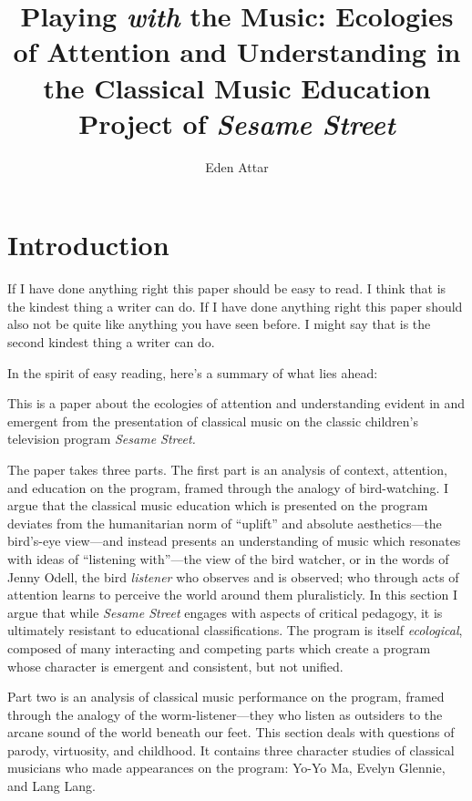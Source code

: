 \documentclass[12pt,letterpaper]{article}
\begin{document}
	
	\title{Playing \textit{with} the Music: Ecologies of Attention and Understanding 
	in the Classical Music Education Project of \textit{Sesame Street}}
	\author{Eden Attar}
	\maketitle
	\doublespacing
	\thispagestyle{empty}
	\newpage
	\clearpage
	\setcounter{page}{1}
	\thispagestyle{empty}
	\frenchspacing
	
	\section*{Introduction}	

	If I have done anything right this paper should be easy to read. I
	think that is the kindest thing a writer can do. If I have
	done anything right this paper should also not be quite like anything 
	you have seen before. I might say that is the second kindest thing a 
	writer can do.  

	In the spirit of easy reading, here's a summary of what lies ahead:

	This is a paper about the ecologies of attention and understanding 
	evident in and emergent from the presentation of classical music on the
	classic children's television program \textit{Sesame Street.}  
	
	The paper takes three parts. The first part is an analysis of context,
	attention, and education on the program, framed through the analogy of
	bird-watching. I argue that the classical music education which is 
	presented on the program deviates from the humanitarian norm of 
	``uplift'' and absolute aesthetics---the bird's-eye view---and instead
	presents an understanding of music which resonates with ideas of 
	``listening with''---the view of the bird watcher, or in the words of
	Jenny Odell, the bird \textit{listener} who observes and is observed;
	who through acts of attention learns to perceive the world around them
	pluralisticly. In this section I argue that while \textit{Sesame
	Street} engages with aspects of critical pedagogy, it is ultimately 
	resistant to educational classifications. The program is itself
	\textit{ecological}, composed of many interacting and competing parts
	which create a program whose character is emergent and consistent, but
	not unified.   

	Part two is an analysis of classical music performance on the program, 
	framed through the analogy of the worm-listener---they who listen as 
	outsiders to 
	the arcane sound of the world beneath our feet. This section deals with
	questions of parody, virtuosity, and childhood. It contains three
	character studies of classical musicians who made appearances on the
	program: Yo-Yo Ma, Evelyn Glennie, and Lang Lang.   
\end{document}
